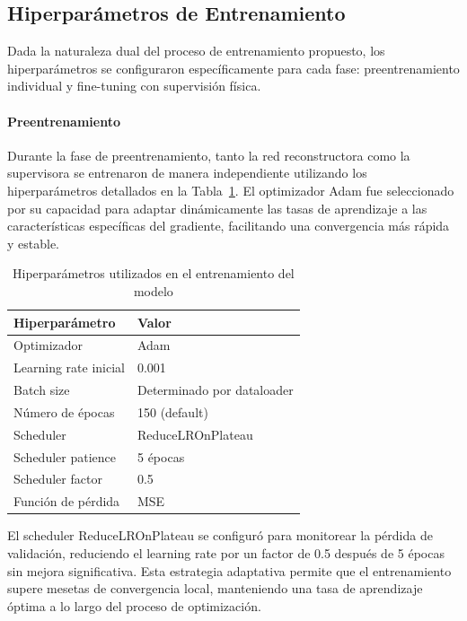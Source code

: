 \subsection{Hiperparámetros de Entrenamiento}

Dada la naturaleza dual del proceso de entrenamiento propuesto, los hiperparámetros se configuraron específicamente para cada fase: preentrenamiento individual y fine-tuning con supervisión física.

\paragraph{Preentrenamiento}

Durante la fase de preentrenamiento, tanto la red reconstructora como la supervisora se entrenaron de manera independiente utilizando los hiperparámetros detallados en la Tabla~\ref{tab:hyperparameters}. El optimizador Adam fue seleccionado por su capacidad para adaptar dinámicamente las tasas de aprendizaje a las características específicas del gradiente, facilitando una convergencia más rápida y estable.

\begin{table}[htbp]
    \centering
    \begin{tabular}{ll}
    \hline
    \textbf{Hiperparámetro} & \textbf{Valor} \\
    \hline
    Optimizador & Adam \\
    Learning rate inicial & 0.001 \\
    Batch size & Determinado por dataloader \\
    Número de épocas & 150 (default) \\
    Scheduler & ReduceLROnPlateau \\
    Scheduler patience & 5 épocas \\
    Scheduler factor & 0.5 \\
    Función de pérdida & MSE \\
    \hline
    \end{tabular}
    \caption{Hiperparámetros utilizados en el entrenamiento del modelo}
    \label{tab:hyperparameters}
\end{table}

El scheduler ReduceLROnPlateau se configuró para monitorear la pérdida de validación, reduciendo el learning rate por un factor de 0.5 después de 5 épocas sin mejora significativa. Esta estrategia adaptativa permite que el entrenamiento supere mesetas de convergencia local, manteniendo una tasa de aprendizaje óptima a lo largo del proceso de optimización.


